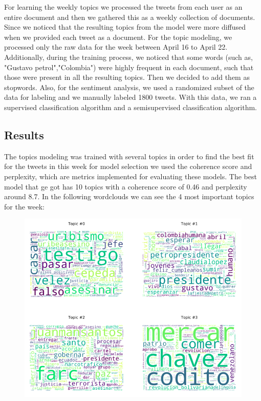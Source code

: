 \documentclass[10pt,a4paper]{article} %
\begin{document}
For learning the weekly topics we processed the tweets from each user as an entire document and then we gathered this as a weekly collection of documents. Since we noticed that the resulting topics from the model were more diffused when we provided each tweet as a document. For the topic modeling, we processed only the raw data for the week between April 16 to April 22. Additionally, during the training process, we noticed that some words (such as, "Gustavo petrol","Colombia") were highly frequent in each document, such that those were present in all the resulting topics. Then we decided to add them as stopwords. Also, for the sentiment analysis, we used a randomized subset of the data for labeling and we manually labeled 1800 tweets. With this data, we ran a supervised classification algorithm and a semisupervised classification algorithm.
	
		\subsection{Results}

The topics modeling was trained with several topics in order to find the best fit for the tweets in this week for model selection we used the coherence score and perplexity, which are metrics implemented for evaluating these models. The best model that ge got has 10 topics with a coherence score of 0.46 and perplexity around 8.7. In the following wordclouds we can see the 4 most important topics for the week:

\begin{figure}[h!]
\includegraphics[width=0.975\linewidth]{week_16.png}
\centering
\end{figure}
\pagebreak
\end{document}
